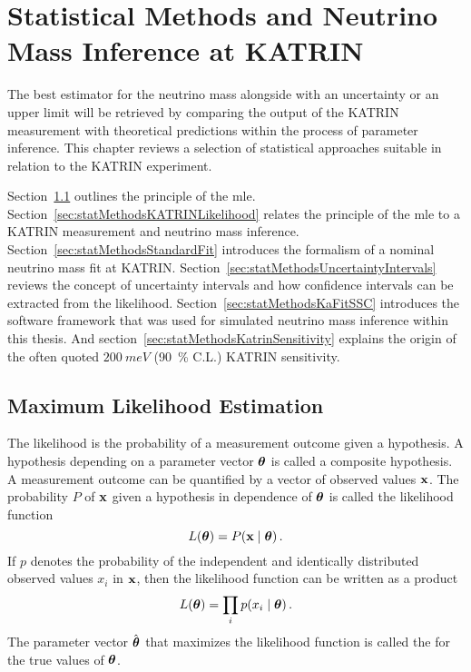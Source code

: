 \def\currentRootFolder{chapter/statisticalMethods}
\def\currentFigureFolder{\currentRootFolder/fig}


\chapter{Statistical Methods and Neutrino Mass Inference at KATRIN}
\label{sec:statMethods}
The best estimator for the neutrino mass alongside with an uncertainty or an upper limit will be retrieved by comparing the output of the KATRIN measurement with theoretical predictions within the process of parameter inference. This chapter reviews a selection of statistical approaches suitable in relation to the KATRIN experiment.

Section~\ref{sec:statMethodsMLE} outlines the principle of the \gls{mle}. Section~\ref{sec:statMethodsKATRINLikelihood} relates the principle of the \gls{mle} to a KATRIN measurement and neutrino mass inference. Section~\ref{sec:statMethodsStandardFit} introduces the formalism of a nominal neutrino mass fit at KATRIN. Section~\ref{sec:statMethodsUncertaintyIntervals} reviews the concept of uncertainty intervals and how confidence intervals can be extracted from the likelihood. Section~\ref{sec:statMethodsKaFitSSC} introduces the software framework that was used for simulated neutrino mass inference within this thesis. And section~\ref{sec:statMethodsKatrinSensitivity} explains the origin of the often quoted $\SI{200}{meV}$ (\SI{90}{\percent} C.L.) KATRIN sensitivity.

\section{Maximum Likelihood Estimation}
\label{sec:statMethodsMLE}
The likelihood is the probability of a measurement outcome given a hypothesis. A hypothesis depending on a parameter vector $\boldsymbol{\mathbf{\theta}}$ is called a composite hypothesis. A measurement outcome can be quantified by a vector of observed values $\boldsymbol{\mathbf{x}}$. The probability $P$ of $\boldsymbol{\mathbf{x}}$ given a hypothesis in dependence of $\boldsymbol{\mathbf{\theta}}$ is called the likelihood function~\cite{ReviewOfParticlePhysics}
\begin{equation}
	L(\paramVec) = P\giventhat{\dataVec}{\paramVec}
	\fullstop
\end{equation}
If $p$ denotes the probability of the independent and identically distributed observed values $x_i$ in $\boldsymbol{\mathbf{x}}$, then the likelihood function can be written as a product~\cite{ReviewOfParticlePhysics}
\begin{equation}
	L(\paramVec) = \prod_{i} p\giventhat{x_i}{\paramVec}
	\fullstop
\end{equation}
The parameter vector $\hat{\boldsymbol{\mathbf{\theta}}}$ that maximizes the likelihood function is called the  for the true values of $\boldsymbol{\mathbf{\theta}}$.


